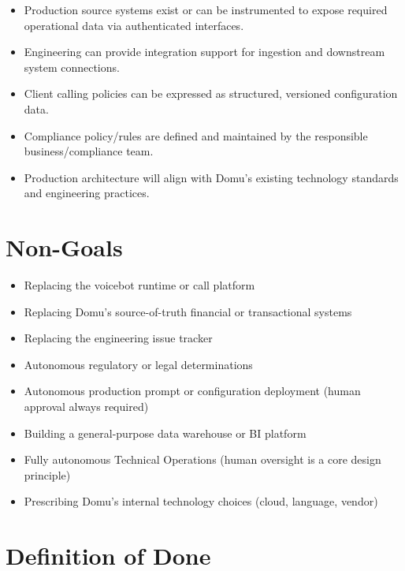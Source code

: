 \documentclass[11pt,a4paper]{article}
\begin{document}
\begin{itemize}
  \item Production source systems exist or can be instrumented to expose required operational data via authenticated interfaces.
  \item Engineering can provide integration support for ingestion and downstream system connections.
  \item Client calling policies can be expressed as structured, versioned configuration data.
  \item Compliance policy/rules are defined and maintained by the responsible business/compliance team.
  \item Production architecture will align with Domu's existing technology standards and engineering practices.
\end{itemize}

\section{Non-Goals}

\begin{itemize}
  \item Replacing the voicebot runtime or call platform
  \item Replacing Domu's source-of-truth financial or transactional systems
  \item Replacing the engineering issue tracker
  \item Autonomous regulatory or legal determinations
  \item Autonomous production prompt or configuration deployment (human approval always required)
  \item Building a general-purpose data warehouse or BI platform
  \item Fully autonomous Technical Operations (human oversight is a core design principle)
  \item Prescribing Domu's internal technology choices (cloud, language, vendor)
\end{itemize}

\section{Definition of Done}
\end{document}
